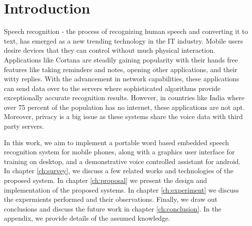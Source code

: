 \chapter{Introduction}
\hspace{3mm}

Speech recognition - the process of recognizing human speech and converting it to text, has emerged as a new trending technology in the IT industry. Mobile users desire devices that they can control without much physical interaction. Applications like Cortana are steadily gaining popularity with their hands free features like taking reminders and notes, opening other applications, and their witty replies. With the advancement in network capabilities, these applications can send data over to the servers where sophisticated algorithms provide exceptionally accurate recognition results. However, in countries like India where over 75 percent of the population has no internet, these applications are not apt. Moreover, privacy is a big issue as these systems share the voice data with third party servers.

In this work, we aim to implement a portable word based embedded speech recognition system for mobile phones, along with a graphics user interface for training on desktop, and a demonstrative voice controlled assistant for android. In chapter \ref{ch:survey}, we discuss a few related works and technologies of the proposed system. In chapter \ref{ch:proposal} we present the design and implementation of the proposed systems. In chapter \ref{ch:experiment} we discuss the expermients performed and their observations. Finally, we draw out conclusions and discuss the future work in chapter \ref{ch:conclusion}. In the appendix, we provide details of the assumed knowledge.